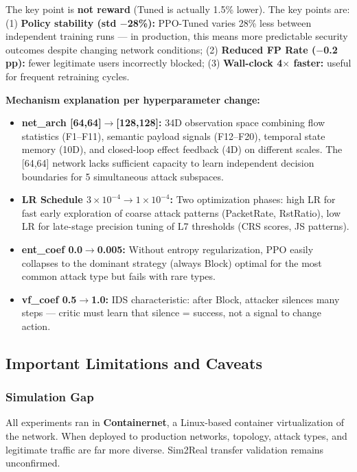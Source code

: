 \documentclass[12pt,a4paper]{report}
\begin{document}
The key point is \textbf{not reward} (Tuned is actually 1.5\% lower). The key points are: (1) \textbf{Policy stability (std $-$28\%):} PPO-Tuned varies 28\% less between independent training runs --- in production, this means more predictable security outcomes despite changing network conditions; (2) \textbf{Reduced FP Rate ($-$0.2 pp):} fewer legitimate users incorrectly blocked; (3) \textbf{Wall-clock 4$\times$ faster:} useful for frequent retraining cycles.

\textbf{Mechanism explanation per hyperparameter change:}
\begin{itemize}
  \item \textbf{net\_arch [64,64]$\to$[128,128]:} 34D observation space combining flow statistics (F1--F11), semantic payload signals (F12--F20), temporal state memory (10D), and closed-loop effect feedback (4D) on different scales. The [64,64] network lacks sufficient capacity to learn independent decision boundaries for 5 simultaneous attack subspaces.
  \item \textbf{LR Schedule $3\times10^{-4}\to1\times10^{-4}$:} Two optimization phases: high LR for fast early exploration of coarse attack patterns (PacketRate, RstRatio), low LR for late-stage precision tuning of L7 thresholds (CRS scores, JS patterns).
  \item \textbf{ent\_coef 0.0$\to$0.005:} Without entropy regularization, PPO easily collapses to the dominant strategy (always Block) optimal for the most common attack type but fails with rare types.
  \item \textbf{vf\_coef 0.5$\to$1.0:} IDS characteristic: after Block, attacker silences many steps --- critic must learn that silence = success, not a signal to change action.
\end{itemize}

\subsection{Important Limitations and Caveats}

\subsubsection{Simulation Gap}

All experiments ran in \textbf{Containernet}, a Linux-based container virtualization of the network. When deployed to production networks, topology, attack types, and legitimate traffic are far more diverse. Sim2Real transfer validation remains unconfirmed.
\end{document}

